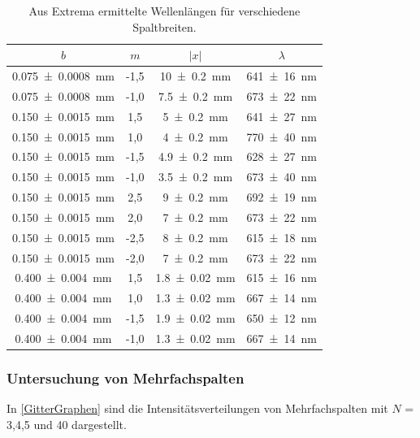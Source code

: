 \documentclass[
	a4paper,
	12pt,
	pagesize,
	ngerman
]{scrartcl}
\begin{document}
	\begin{table}[H]
		\centering
		\begin{tabular}{ c | c | c | c }
			$b$ & $m$ &  $|x|$ & $\lambda$ \\ \hline
			\SI{0,075 +- 0,0008}{mm} & -1,5 & \SI{10 +- 0,2}{mm} & \SI{641 +- 16}{nm} \\
			\SI{0,075+- 0,0008}{mm} & -1,0 & \SI{7,5 +- 0,2}{mm} & \SI{673+-22}{nm} \\
			
			\SI{0,150+- 0,0015}{mm} & 1,5 & \SI{5 +- 0,2}{mm} & \SI{641+-27}{nm} \\
			\SI{0,150+- 0,0015}{mm} & 1,0 & \SI{4 +- 0,2}{mm} & \SI{770+-40}{nm} \\
			\SI{0,150+- 0,0015}{mm} & -1,5 & \SI{4,9 +- 0,2}{mm} & \SI{628+-27}{nm} \\
			\SI{0,150+- 0,0015}{mm} & -1,0 & \SI{3,5 +- 0,2}{mm} & \SI{673+-40}{nm} \\
			
			\SI{0,150+- 0,0015}{mm} & 2,5 & \SI{9 +- 0,2}{mm} & \SI{692+-19}{nm} \\
			\SI{0,150+- 0,0015}{mm} & 2,0 & \SI{7 +- 0,2}{mm} & \SI{673+-22}{nm} \\
			\SI{0,150+- 0,0015}{mm} & -2,5 & \SI{8 +- 0,2}{mm} & \SI{615+-18}{nm} \\
			\SI{0,150+- 0,0015}{mm} & -2,0 & \SI{7 +- 0,2}{mm} & \SI{673+-22}{nm} \\
			
			\SI{0,400+- 0,004}{mm} & 1,5 & \SI{1,8 +- 0,02}{mm} & \SI{615+-16}{nm} \\
			\SI{0,400+- 0,004}{mm} & 1,0 & \SI{1,3 +- 0,02}{mm} & \SI{667+-14}{nm} \\
			\SI{0,400+- 0,004}{mm} & -1,5 & \SI{1,9 +- 0,02}{mm} & \SI{650+-12}{nm} \\
			\SI{0,400+- 0,004}{mm} & -1,0 & \SI{1,3 +- 0,02}{mm} & \SI{667+-14}{nm} \\
		\end{tabular}
		\caption{Aus Extrema ermittelte Wellenlängen für verschiedene Spaltbreiten.}
		\label{Einzelspalte} 
	\end{table}
	
	

	\subsubsection{Untersuchung von Mehrfachspalten} 
	In \cref{GitterGraphen} sind die Intensitätsverteilungen von Mehrfachspalten mit $N$ = 3,4,5 und 40 dargestellt. 
	\label{Maximaintensitäten}
\end{document}
